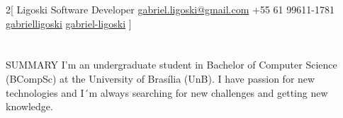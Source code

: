 \documentclass{my_cv}
\begin{document}
\begin{multicols}{2}[
        {Ligoski}%
        {Software Developer}%
        {\href{mailto:gabriel.ligoski@gmail.com}{gabriel.ligoski@gmail.com}}%
        {+55 61 99611-1781}%
        {\href{https://github.com/gabrielligoski}{gabrielligoski} }%
        {\href{https://www.linkedin.com/in/gabriel-ligoski/}{gabriel-ligoski} }%
]
\end{multicols}
\vspace{15mm}
\section{\faFileText}{SUMMARY}
I'm an undergraduate student in Bachelor of Computer Science (BCompSc) at the University of Brasília (UnB). I have passion for new technologies and I´m always searching for new challenges and getting new knowledge.

\vspace{5mm}
\end{document}
